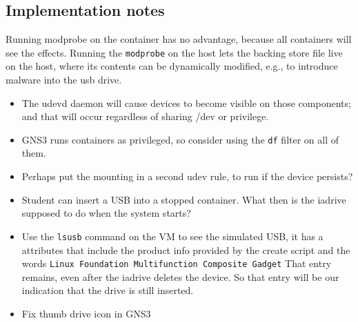 \documentclass[12pt]{article}
\begin{document}
\subsection{Implementation notes}   
Running modprobe on the container has no advantage, because all containers will see the effects.  Running the {\tt modprobe} on the 
host lets the backing store file live on the host, where its contents can be
dynamically modified, e.g., to introduce malware into the usb drive.



\begin{itemize}
\item The udevd daemon will cause devices to become visible on those components; and that will occur regardless of sharing /dev or privilege.
\item GNS3 runs containers as privileged, so consider using the {\tt df} filter on all of them.
\item Perhaps put the mounting in a second udev rule, to run if the device persists?
\item Student can insert a USB into a stopped container.  What then is the iadrive supposed to do when the system starts?
\item Use the {\tt lsusb} command on the VM to see the simulated USB, it has a attributes that include the product info provided by the
create script and the words {\tt Linux Foundation Multifunction Composite Gadget}
That entry remains, even after the iadrive deletes the device.  So that entry will be our indication that the drive is still inserted.
\item Fix thumb drive icon in GNS3
\end{itemize}
\end{document}
